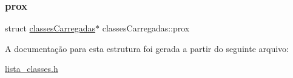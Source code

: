 \mbox{\label{structclassesCarregadas_a9be874f129111fad8157f3e4205e9e98}} 
\subsubsection{\texorpdfstring{prox}{prox}}
{\footnotesize\ttfamily struct \hyperlink{structclassesCarregadas}{classes\+Carregadas}$\ast$ classes\+Carregadas\+::prox}



A documentação para esta estrutura foi gerada a partir do seguinte arquivo\+:\begin{DoxyCompactItemize}
\item 
\hyperlink{lista__classes_8h}{lista\+\_\+classes.\+h}\end{DoxyCompactItemize}

